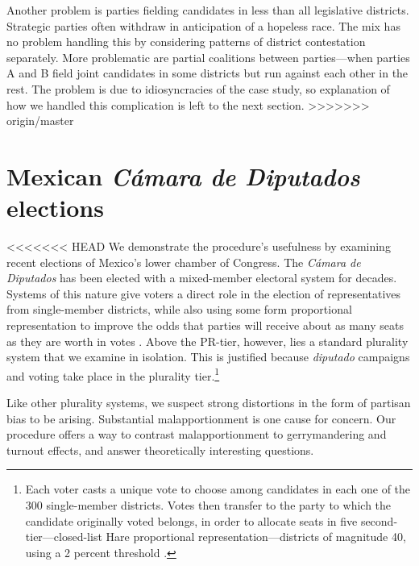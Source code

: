 \documentclass[letter,12pt]{article}
\begin{document}
Another problem is parties fielding candidates in less than all legislative districts. Strategic parties often withdraw in anticipation of a hopeless race. The mix has no problem handling this by considering patterns of district contestation separately. More problematic are partial coalitions between parties---when parties A and B field joint candidates in some districts but run against each other in the rest. The problem is due to idiosyncracies of the case study, so explanation of how we handled this complication is left to the next section. 
>>>>>>> origin/master

\section{Mexican \emph{C\'amara de Diputados} elections}


<<<<<<< HEAD
We demonstrate the procedure's usefulness by examining recent elections of Mexico's lower chamber of Congress. The \emph{C\'amara de Diputados} has been elected with a mixed-member electoral system for decades. Systems of this nature give voters a direct role in the election of representatives from single-member districts, while also using some form proportional representation to improve the odds that parties will receive about as many seats as they are worth in votes \citep{shugart.wattenbergIntro2001}. Above the PR-tier, however, lies a standard plurality system that we examine in isolation. This is justified because  \emph{diputado} campaigns and voting take place in the plurality tier.\footnote{Each voter casts a unique vote to choose among candidates in each one of the 300 single-member districts. Votes then transfer to the party to which the candidate originally voted belongs, in order to allocate seats in five second-tier---closed-list Hare proportional representation---districts of magnitude 40, using a 2 percent threshold \citep{weldonMixedMemberSys2001}.}

Like other plurality systems, we suspect strong distortions in the form of partisan bias to be arising. Substantial malapportionment is one cause for concern. Our procedure offers a way to contrast malapportionment to gerrymandering and turnout effects, and answer theoretically interesting questions. 
\end{document}
